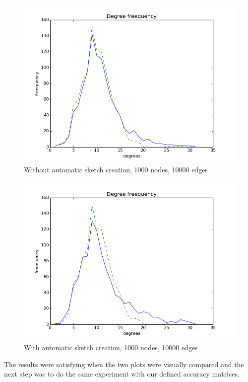 \documentclass[12pt]{report}
\numberwithin{figure}{section}
\numberwithin{table}{section}
\begin{document}
\begin{figure}[H]
\centering
\includegraphics[scale=0.6]{images/ddas1}
\caption{Without automatic sketch creation, 1000 nodes, 10000 edges}
\end{figure}

\begin{figure}[H]
\centering
\includegraphics[scale=0.6]{images/ddas2}
\caption{With automatic sketch creation, 1000 nodes, 10000 edges}
\end{figure}

The results were satisfying when the two plots were visually compared and the next step was to do the same experiment with our defined accuracy matrices. 
\end{document}
